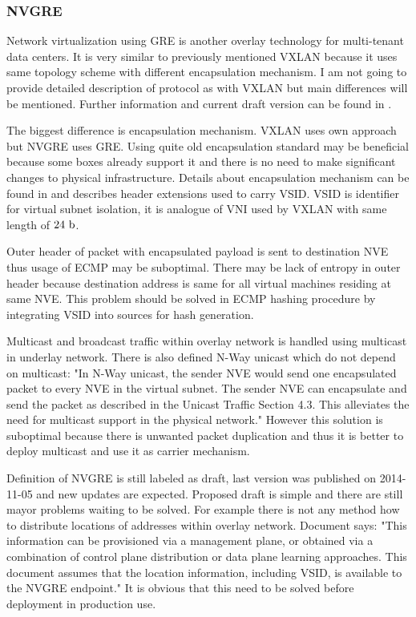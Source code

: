 \subsubsection{NVGRE}
Network virtualization using \Ac{GRE} is another overlay technology for multi-tenant data centers. It is very similar to previously mentioned \Ac{VXLAN} because it uses same topology scheme with different encapsulation mechanism. I am not going to provide detailed description of protocol as with \Ac{VXLAN} but main differences will be mentioned. Further information and current draft version can be found in \cite{draft-nvgre}\cite{rfc2748}\cite{rfc2890}.

The biggest difference is encapsulation mechanism. \Ac{VXLAN} uses own approach but \Ac{NVGRE} uses \Ac{GRE}.  Using quite old encapsulation standard may be beneficial because some boxes already support it and there is no need to make significant changes to physical infrastructure. Details about encapsulation mechanism can be found in \cite{rfc2748} and \cite{rfc2890} describes header extensions used to carry \Ac{VSID}. \Ac{VSID} is identifier for virtual subnet isolation, it is analogue of \Ac{VNI} used by \Ac{VXLAN} with same length of $24~\mathrm{b}$.

Outer header of packet with encapsulated payload is sent to destination \Ac{NVE} thus usage of \Ac{ECMP} may be suboptimal. There may be lack of entropy in outer header because destination address is same for all virtual machines residing at same \Ac{NVE}. This problem should be solved in \Ac{ECMP} hashing procedure by integrating \Ac{VSID} into sources for hash generation.

Multicast and broadcast traffic within overlay network is handled using multicast in underlay network. There is also defined N-Way unicast which do not depend on multicast: "In N-Way unicast, the sender NVE would send one encapsulated packet to every NVE in the virtual subnet. The sender NVE can encapsulate and send the packet as described in the Unicast Traffic Section 4.3. This alleviates the need for multicast support in the physical network." \cite{draft-nvgre}
However this solution is suboptimal because there is unwanted packet duplication and thus it is better to deploy multicast and use it as carrier mechanism.

Definition of \Ac{NVGRE} \cite{draft-nvgre} is still labeled as draft, last version was published on 2014-11-05 and new updates are expected. Proposed draft is  simple and there are still mayor problems waiting to be solved. For example there is not any method how to distribute locations of addresses within overlay network. Document \cite{draft-nvgre} says: "This information can be provisioned via a management plane, or obtained via a combination of control plane distribution or data plane learning approaches. This document assumes that the location information, including VSID, is available to the NVGRE endpoint." It is obvious that this need to be solved before deployment in production use. 

